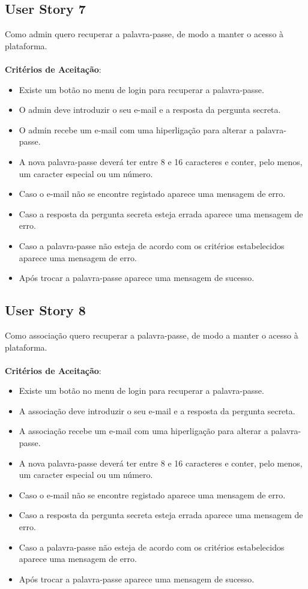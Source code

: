 \documentclass[a4paper,11pt]{article}
\begin{document}
\subsection{User Story 7}
Como admin quero recuperar a palavra-passe, de modo a manter o acesso à plataforma.\\\\
\textbf{Critérios de Aceitação}:
\begin{itemize}
  \item Existe um botão no menu de login para recuperar a palavra-passe.
  \item O admin deve introduzir o seu e-mail e a resposta da pergunta secreta.
  \item O admin recebe um e-mail com uma hiperligação para alterar a palavra-passe.
  \item A nova palavra-passe deverá ter entre 8 e 16 caracteres e conter, pelo menos, um caracter especial ou um número.
  \item Caso o e-mail não se encontre registado aparece uma mensagem de erro.
  \item Caso a resposta da pergunta secreta esteja errada aparece uma mensagem de erro.
  \item Caso a palavra-passe não esteja de acordo com os critérios estabelecidos aparece uma mensagem de erro.
  \item Após trocar a palavra-passe aparece uma mensagem de sucesso.
\end{itemize}

\subsection{User Story 8}
Como associação quero recuperar a palavra-passe, de modo a manter o acesso à plataforma.\\\\
\textbf{Critérios de Aceitação}:
\begin{itemize}
  \item Existe um botão no menu de login para recuperar a palavra-passe.
  \item A associação deve introduzir o seu e-mail e a resposta da pergunta secreta.
  \item A associação recebe um e-mail com uma hiperligação para alterar a palavra-passe.
  \item A nova palavra-passe deverá ter entre 8 e 16 caracteres e conter, pelo menos, um caracter especial ou um número.
  \item Caso o e-mail não se encontre registado aparece uma mensagem de erro.
  \item Caso a resposta da pergunta secreta esteja errada aparece uma mensagem de erro.
  \item Caso a palavra-passe não esteja de acordo com os critérios estabelecidos aparece uma mensagem de erro.
  \item Após trocar a palavra-passe aparece uma mensagem de sucesso.
\end{itemize}
\end{document}
